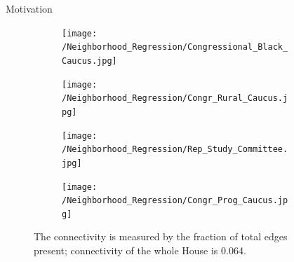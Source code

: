\documentclass[final]{beamer}
\newlength{\sepwid}
\newlength{\onecolwid}
\begin{document}
\begin{frame}[t]
\begin{columns}[t]
\begin{column}{\onecolwid}
\begin{block}{Motivation}
\begin{figure}[h]
  \centering
    \begin{subfigure}[b]{0.49\textwidth}
        \texttt{[image: /Neighborhood\_Regression/Congressional\_Black\_Caucus.jpg]}
    \end{subfigure}
          \begin{subfigure}[b]{0.49\textwidth}
        \texttt{[image: /Neighborhood\_Regression/Congr\_Rural\_Caucus.jpg]}
    \end{subfigure}
        \begin{subfigure}[b]{0.49\textwidth}
        \texttt{[image: /Neighborhood\_Regression/Rep\_Study\_Committee.jpg]}
    \end{subfigure}
          \begin{subfigure}[b]{0.49\textwidth}
        \texttt{[image: /Neighborhood\_Regression/Congr\_Prog\_Caucus.jpg]}
    \end{subfigure}
\caption{{\selectfont 
The connectivity is measured by the fraction of total edges present; connectivity of the whole House is 0.064.}}
\end{figure}

\end{block}




\end{column} %

\begin{column}{\sepwid}\end{column} %


\end{columns}
\end{frame}
\end{document}
